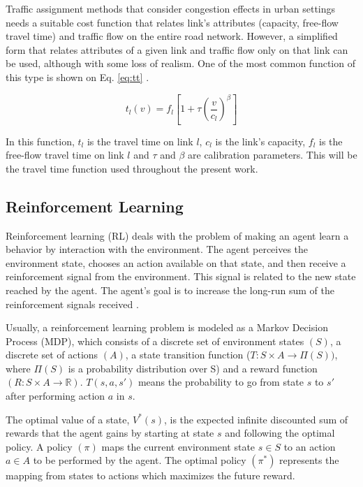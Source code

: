 \documentclass[12pt]{llncs}
\newcommand{\travTime}{\ensuremath{t_l}} 	%
\newcommand{\fftt}{\ensuremath{f_l}} 		%
\newcommand{\linkCap}{\ensuremath{c_l}}		%
\newcommand{\veh}{\ensuremath{v}}		%
\begin{document}
Traffic assignment methods that consider congestion effects in urban settings needs a suitable cost function that relates link's attributes (capacity, free-flow travel time) and traffic flow on the entire road network. However, a simplified form that relates attributes of a  given link and traffic flow only on that link can be used, although with some loss of realism. One of the most common function of this type is shown on Eq. \eqref{eq:tt} \cite{Ortuzar&Willumsen2001}.

\begin{equation}
\label{eq:tt}
\travTime(\veh) = \fftt[1 + \tau \left(\frac{\veh}{\linkCap}\right)^\beta]
\end{equation}

In this function, $\travTime$ is the travel time on link $l$, $\linkCap$ is the link's capacity, $\fftt$ is the free-flow travel time on link $l$ and $\tau$ and $\beta$ are calibration parameters. This will be the travel time function used throughout the present work.

\subsection{Reinforcement Learning}

Reinforcement learning (RL) deals with the problem of making an agent learn a behavior by interaction with the environment. The agent perceives the environment state, chooses an action available on that state, and then receive a reinforcement signal from the environment. This signal is related to the new state reached by the agent. The agent's goal is to increase the long-run sum of the reinforcement signals received \cite{Kaelbling+1996}.

Usually, a reinforcement learning problem is modeled as a Markov Decision Process (MDP), which consists of a discrete set of environment states $(S)$, a discrete set of actions $(A)$, a state transition function ($T: S \times A \to \Pi(S))$, where $\Pi(S)$ is a probability distribution over S) and a reward function $(R: S \times A \to \mathbb{R})$. $T(s, a, s')$ means the probability to go from state $s$ to $s'$ after performing action $a$ in $s$.

The optimal value of a state, $V^*(s)$, is the expected infinite discounted sum of rewards that the agent gains by starting at state $s$ and following the optimal policy. A policy $(\pi)$ maps the current environment state $s \in S$ to an action $a \in A$ to be performed by the agent. The optimal policy $(\pi^*)$ represents the mapping from states to actions which maximizes the future reward.
\end{document}
